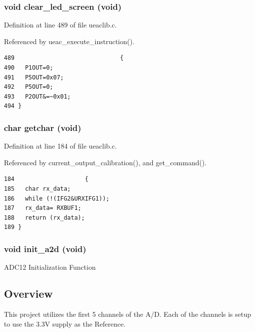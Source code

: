 \subsubsection{\setlength{\rightskip}{0pt plus 5cm}void clear\_\-led\_\-screen (void)}\label{ueaclib_8c_a23}




Definition at line 489 of file ueaclib.c.

Referenced by ueac\_\-execute\_\-instruction().

\footnotesize\begin{verbatim}489                              {
490   P1OUT=0;
491   P5OUT=0x07;
492   P5OUT=0;
493   P2OUT&=~0x01;
494 }
\end{verbatim}\normalsize 


\subsubsection{\setlength{\rightskip}{0pt plus 5cm}char getchar (void)}\label{ueaclib_8c_a16}




Definition at line 184 of file ueaclib.c.

Referenced by current\_\-output\_\-calibration(), and get\_\-command().

\footnotesize\begin{verbatim}184                    {
185   char rx_data;
186   while (!(IFG2&URXIFG1));
187   rx_data= RXBUF1;
188   return (rx_data);
189 }
\end{verbatim}\normalsize 


\subsubsection{\setlength{\rightskip}{0pt plus 5cm}void init\_\-a2d (void)}\label{ueaclib_8c_a8}


ADC12 Initialization Function \subsection{Overview}\label{ueaclib_8c_AA}
This project utilizes the first 5 channels of the A/D. Each of the channels is setup to use the 3.3V supply as the Reference. \par
